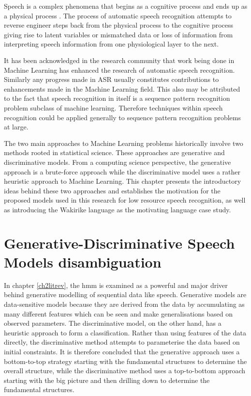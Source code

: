 Speech is a complex phenomena that begins as a cognitive process and ends up as a physical process \citep{becchetti1998}.  The process of automatic speech recognition attempts to reverse engineer steps back from the physical process to the cognitive process giving rise to latent variables or mismatched data or loss of information from interpreting speech information from one physiological layer to the next.

It has been acknowledged in the research community \citep{2015watanabe,deng2013machine}  that work being done in Machine Learning has enhanced the research of automatic speech recognition.   Similarly any progress made in ASR usually constitutes contributions to enhancements made in the Machine Learning field.  This also may be attributed to the fact that speech recognition in itself is a sequence pattern recognition problem subclass of machine learning.  Therefore techniques within speech recognition could be applied generally to sequence pattern recognition problems at large.

The two main approaches to Machine Learning problems historically involve two methods rooted in statistical science.  These approaches are generative and discriminative models.  From a computing science perspective, the generative approach is a brute-force approach while the discriminative model uses a rather heuristic approach to Machine Learning. This chapter presents the introductory ideas behind these two approaches and establishes the motivation for the proposed models used in this research for low resource speech recognition, as well as introducing the Wakirike language as the motivating language case study.

\section{Generative-Discriminative Speech Models disambiguation}
\pagestyle{fancy}
In chapter \ref{ch2litrev}, the \acrfull{hmm} is examined as a powerful and major driver behind generative modelling of sequential data like speech.  Generative models are data-sensitive models because they are derived from the data by accumulating as many different features which can be seen and make generalisations based on observed parameters. The discriminative model, on the other hand, has a heuristic approach to form a classification.  Rather than using features of the data directly, the discriminative method attempts to parameterise the data based on initial constraints\citep{lasserre2006principled}. It is therefore concluded that the generative approach uses a bottom-to-top strategy starting with the fundamental structures to determine the overall structure, while the discriminative method uses a top-to-bottom approach starting with the big picture and then drilling down to determine the fundamental structures.

